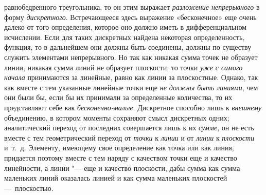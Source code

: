 равнобедренного треугольника, то он этим выражает
{\em разложение непрерывного} в форму
{\em дискретного}. Встречающееся здесь выражение
«бесконечное» еще очень далеко от того определения, которое оно должно
иметь в дифференциальном исчислении. Если для таких дискретных найдена
некоторая определенность, функция, то в дальнейшем они должны быть
соединены, должны по существу служить элементами непрерывного. Но так как
никакая сумма точек не образует линии, никакая сумма линий не образует
плоскости, то точки {\em уже с самого начала}
принимаются за линейные, равно как линии за плоскостные. Однако, так как
вместе с тем указанные линейные точки еще {\em не
должны быть линиями}, чем они были бы, если бы их принимали за определенные
количества, то их представляют себе как
{\em бесконечно-малые}. Дискретное способно лишь к
{\em внешнему} объединению, в котором моменты сохраняют
смысл дискретных одних; аналитический переход от последних совершается лишь
к их {\em сумме}, он не есть вместе с тем
геометрический переход от {\em точки} к
{\em линии} и от {\em линии} к
{\em плоскости} и~т.~д. Элементу, имеющему свое
определение как точка или как линия, придается поэтому вместе с тем наряду
с качеством точки еще и качество линейности, а линии "--- еще и качество
плоскости, дабы сумма как сумма маленьких линий оказалась линией и как
сумма маленьких плоскостей —~плоскостью.

